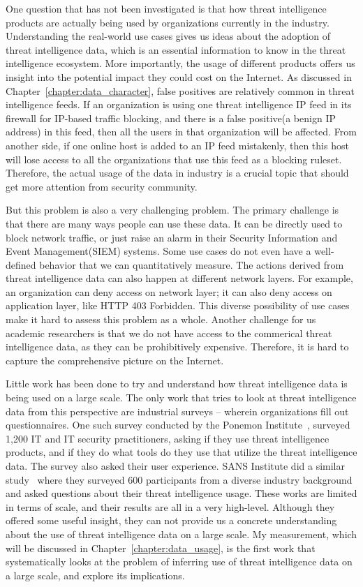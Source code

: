 One question that has not been investigated is that how threat intelligence 
products are actually being used by organizations currently in the industry.
Understanding the real-world use cases gives us ideas about the adoption of threat
intelligence data, which is an essential information to know in the threat
intelligence ecosystem. More importantly, the usage of different products offers
us insight into the potential impact they could cost on the Internet. As 
discussed in Chapter~\ref{chapter:data_character}, false positives are relatively 
common in threat intelligence feeds. If an organization is using one threat
intelligence IP feed in its firewall for IP-based traffic blocking, and there
is a false positive(a benign IP address) in this feed, then all the users in
that organization will be affected. From another side, if one online host is
added to an IP feed mistakenly, then this host will lose access to all the
organizations that use this feed as a blocking ruleset. Therefore, the actual
usage of the data in industry is a crucial topic that should get more attention
from security community.

But this problem is also a very challenging problem. The primary challenge 
is that there are many ways people can use these data. It can be directly 
used to block network traffic, or just raise an alarm in their Security
Information and Event Management(SIEM) systems. Some use cases do not even 
have a well-defined behavior that we can quantitatively measure. 
The actions derived from threat intelligence data can also happen at different
network layers. For example, an organization can deny access on network layer; 
it can also deny access on application layer, like HTTP 403 Forbidden. 
This diverse possibility of use cases make it hard to assess this problem as 
a whole. Another challenge for us academic researchers is that we do not have 
access to the commerical threat intelligence data, as they can be prohibitively
expensive. Therefore, it is hard to capture the comprehensive picture on the
Internet.

Little work has been done to try and understand how threat
intelligence data is being used on a large scale. The only work that tries to
look at threat intelligence data from this perspective are industrial surveys
-- wherein organizations fill out questionnaires. One such survey conducted by
the Ponemon Institute~\cite{ponemon2018cti}, surveyed 1,200 IT and IT
security practitioners, asking if they use threat intelligence products, and
if they do what tools do they use that utilize the threat intelligence data.
The survey also asked their user experience. SANS Institute did a
similar study~\cite{shackleford2017cyber} where they surveyed 600
participants from a diverse industry background and asked questions about
their threat intelligence usage. These works are limited in terms
of scale, and their results are all in a very high-level. Although they offered
some useful insight, they can not provide us a concrete understanding
about the use of threat intelligence data on a large scale. My measurement,
which will be discussed in Chapter~\ref{chapter:data_usage},
is the first work that systematically looks at the problem of inferring use
of threat intelligence data on a large scale, and explore its implications.
